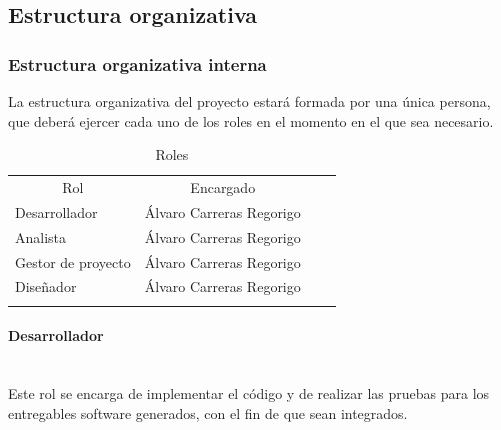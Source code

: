 \documentclass[twoside]{report}
\begin{document}
\subsection{Estructura organizativa}
\subsubsection{Estructura organizativa interna}
La estructura organizativa del proyecto estará formada por una única persona, que deberá ejercer cada uno de los roles en el momento en el que sea necesario. \cite{upedu} \vspace{0.5cm}

\begin{table}[H]
\begin{tabular}{llll}
\cline{1-2}
\multicolumn{1}{|c|}{Rol} & \multicolumn{1}{c|}{Encargado} &  &  \\ \cline{1-2}
\multicolumn{1}{|l|}{Desarrollador}                                      & \multicolumn{1}{l|}{Álvaro Carreras Regorigo}                                          &  &  \\ \cline{1-2}
\multicolumn{1}{|l|}{Analista}                                           & \multicolumn{1}{l|}{Álvaro Carreras Regorigo}                                          &  &  \\ \cline{1-2}
\multicolumn{1}{|l|}{Gestor de proyecto}                                 & \multicolumn{1}{l|}{Álvaro Carreras Regorigo}                                          &  &  \\ \cline{1-2}
\multicolumn{1}{|l|}{Diseñador}                                          & \multicolumn{1}{l|}{Álvaro Carreras Regorigo}                                                         &  &  \\ \cline{1-2}
                                                                         &                                                                               &  & 
\end{tabular}
\centering
\caption{Roles}
\end{table}
\vspace{0.5cm}

\paragraph{Desarrollador}\mbox{}\\

Este rol se encarga de implementar el código y de realizar las pruebas para los entregables software generados, con el fin de que sean integrados.
\end{document}

